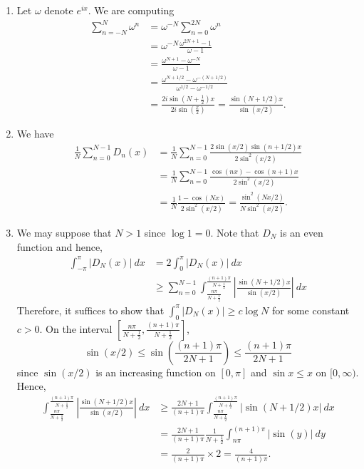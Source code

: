 \documentclass[12pt]{amsart}
\newcommand{\half}{\frac{1}{2}}
\begin{document}
\begin{enumerate}[label=(\alph*)]
    \item Let $\omega$ denote $e^{ix}$. We are computing 
    \begin{align*}
        \sum_{n = -N}^N \omega^n &= \omega^{-N}\sum_{n = 0}^{2N}\omega^n\\ 
        &= \omega^{-N}\frac{\omega^{2N + 1} - 1}{\omega - 1}\\
        &= \frac{\omega^{N + 1} - \omega^{-N}}{\omega - 1}\\
        &= \frac{\omega^{N + 1/2} - \omega^{-(N + 1/2)}}{\omega^{1/2} - \omega^{-1/2}}\\
        &= \frac{2i\sin\left(N + \frac{1}{2}\right)x}{2i\sin\left(\frac{x}{2}\right)} = \frac{\sin\left(N + 1/2\right)x}{\sin(x/2)}.
    \end{align*}

    \item We have 
    \begin{align*}
        \frac{1}{N}\sum_{n = 0}^{N - 1}D_n(x) &= \frac{1}{N}\sum_{n = 0}^{N - 1}\frac{2\sin(x/2)\sin(n + 1/2)x}{2\sin^2(x/2)}\\
        &= \frac{1}{N}\sum_{n = 0}^{N - 1}\frac{\cos(nx) - \cos(n + 1)x}{2\sin^2(x/2)}\\
        &= \frac{1}{N}\frac{1 - \cos(Nx)}{2\sin^2(x/2)} = \frac{\sin^2(Nx/2)}{N\sin^2(x/2)}.
    \end{align*}

    \item We may suppose that $N > 1$ since $\log 1 = 0$. Note that $D_N$ is an even function and hence, 
    \begin{align*}
        \int_{-\pi}^{\pi}|D_N(x)|~dx &= 2\int_{0}^{\pi} |D_N(x)|~dx\\
        &\ge\sum_{n = 0}^{N - 1}\int_{\frac{n\pi}{N + \frac{1}{2}}}^{\frac{(n + 1)\pi}{N + \half}}\left|\frac{\sin(N + 1/2)x}{\sin(x/2)}\right|~dx
    \end{align*}
    Therefore, it suffices to show that $\int_{0}^{\pi}|D_N(x)|\ge c\log N$ for some constant $c > 0$. On the interval $\left[\frac{n\pi}{N + \half}, \frac{(n + 1)\pi}{N + \half}\right]$, 
    \begin{equation*}
        \sin(x/2)\le\sin\left(\frac{(n + 1)\pi}{2N + 1}\right)\le\frac{(n + 1)\pi}{2N + 1}
    \end{equation*}
    since $\sin(x/2)$ is an increasing function on $[0,\pi]$ and $\sin x\le x$ on $[0,\infty)$. Hence, 
    \begin{align*}
        \int_{\frac{n\pi}{N + \frac{1}{2}}}^{\frac{(n + 1)\pi}{N + \half}}\left|\frac{\sin(N + 1/2)x}{\sin(x/2)}\right|~dx &\ge\frac{2N + 1}{(n + 1)\pi}\int_{\frac{n\pi}{N + \frac{1}{2}}}^{\frac{(n + 1)\pi}{N + \half}}\left|{\sin(N + 1/2)x}\right|~dx\\
        &= \frac{2 N + 1}{(n + 1)\pi}\frac{1}{N + \frac{1}{2}}\int_{n\pi}^{(n + 1)\pi}|\sin(y)|~dy\\
        &= \frac{2}{(n + 1)\pi}\times 2 = \frac{4}{(n + 1)\pi}.
    \end{align*}


\end{enumerate}
\end{document}
